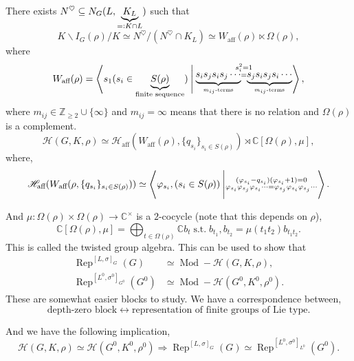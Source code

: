 \documentclass[8pt]{article}
\DeclareMathOperator{\st}{s.t.}
\DeclareMathOperator{\Rep}{Rep}
\DeclareMathOperator{\Mod}{Mod}
\newcommand{\defqe}{=\vcentcolon}
\newcommand{\Z}[0]{\mathbb{Z}}
\newcommand{\C}[0]{\mathbb{C}}
\newcommand{\hecke}[0]{\mathscr{H}}
\begin{document}
There exists $N^\heartsuit\subseteq N_G(L,\underbrace{K_L}_{\defqe K\cap L})$ such that 
\begin{equation*}
  K\backslash I_G(\rho)/K\simeq N^\heartsuit/(N^\heartsuit \cap K_L)\simeq W_{\text{aff}}(\rho)\ltimes\Omega(\rho),
\end{equation*}
where 
\begin{equation*}
  W_{\text{aff}}(\rho) = \left\langle s_1(s_i\in \underbrace{S(\rho)}_{\text{finite sequence}})\:\Bigg{|}\:\substack{s_i^2=1\\ \underbrace{s_is_js_is_j \cdots}_{\text{$m_{ij}$-terms}} = \underbrace{s_js_is_js_i\cdots}_{\text{$m_{ij}$-terms}}}\right\rangle,
\end{equation*}
where $m_{ij}\in \Z_{\geq 2}\cup\{\infty\}$ and $m_{ij}=\infty$ means that there is no relation and $\Omega(\rho)$ is a complement.
\begin{equation*}
  \hecke(G,K,\rho)\simeq\hecke_{\text{aff}}(W_{\text{aff}}(\rho),\{q_{s_i}\}_{s_i\in S(\rho)})\rtimes\C[\Omega(\rho),\mu],
\end{equation*}
where,
\begin{equation*}
  \hecke_{\text{aff}}(W_{\text{aff}}(\rho,\{q_{s_i}\}_{s_i\in S(\rho)}))\simeq\left\langle\varphi_{s_i},(s_i\in S(\rho))\:\Bigg{|}\substack{(\varphi_{s_i}-q_{s_i})(\varphi_{s_i}+1)=0\\ \varphi_{s_i}\varphi_{s_j}\varphi_{s_i}\cdots = \varphi_{s_j}\varphi_{s_i}\varphi_{s_j}\cdots}\right\rangle.
\end{equation*}

And $\mu:\Omega(\rho)\times\Omega(\rho)\to\C^\times$ is a $2$-cocycle (note that this depends on $\rho$),
\begin{equation*}
  \C[\Omega(\rho),\mu]=\bigoplus_{t\in\Omega(\rho)}\C b_t\st b_{t_1},b_{t_2}=\mu(t_1t_2)b_{t_1t_2}.
\end{equation*}
This is called the twisted group algebra. 
This can be used to show that 
\begin{align*}
\Rep^{[L,\sigma]_G}(G)&\simeq\Mod-\hecke(G,K,\rho),\\
\Rep^{[L^0,\sigma^0]_{G^0}}(G^0) & \simeq\Mod-\hecke(G^0,K^0,\rho^0).
\end{align*}
These are somewhat easier blocks to study. We have a correspondence between,
\begin{equation*}
  \text{depth-zero block}\leftrightarrow\text{representation of finite groups of Lie type}.
\end{equation*}

And we have the following implication,
\begin{equation*}
  \hecke(G,K,\rho)\simeq\hecke(G^0,K^0,\rho^0)\Rightarrow\Rep^{[L,\sigma]_G}(G)\simeq\Rep^{[L^0,\sigma^0]_{L^0}}(G^0).
\end{equation*}
\end{document}
